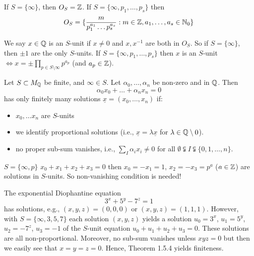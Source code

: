 \documentclass[NumTh.tex]{subfiles}
\begin{document}
\begin{ex}
  If $S = \{\infty\}$, then $O_S = \mathbb{Z}$.
  If $S = \{\infty,p_1,\dots,p_s \}$ then
  \[ O_S = \{ \frac{m}{p_1^{a_1} \dots p_s^{a_s}} : m \in \mathbb{Z}, a_1,\dots,a_s \in \mathbb{N}_0 \} \]
\end{ex}

We say $x \in \mathbb{Q}$ is an $S$-unit if $x \neq 0$ and $x, x^{-1}$ are both in $O_S$.
So if $S = \{ \infty \}$, then $\pm 1$ are the only $S$-units. If $S = \{ \infty,p_1,\dots,p_s \}$ then $x$ is an $S$-unit $\iff x = \pm \prod_{p \in S \setminus \infty} p^{a_p}$ (and $a_p \in \mathbb{Z}$).

\begin{theorem}
  Let $S \subset M_{\mathbb{Q}}$ be finite, and $\infty \in S$. Let $\alpha_0,\dots,\alpha_n$ be non-zero and in $\mathbb{Q}$.
  Then 
  \[ \alpha_0 x_0 + \dots + \alpha_n x_n = 0 \]
  has only finitely many solutions $\underline{x} = (x_0,\dots,x_n)$ if:
  \begin{itemize}
    \item $x_0,\dots x_n$ are $S$-units
    \item we identify proportional solutions (i.e., $\underline{x} = \lambda \underline{x}$ for $ \lambda \in \mathbb{Q} \setminus 0$).
    \item no proper sub-sum vanishes, i.e., $\sum_{I} \alpha_i x_i \neq 0$ for all $\emptyset \subsetneqq I \subsetneqq \{0,1,\dots,n\}$.
  \end{itemize}
\end{theorem}

\begin{rem}
  $S = \{\infty, p \}$ $x_0+x_1+x_2+x_3 = 0$ then $x_0 = - x_1 =  1$, $x_2 = - x_3 = p^a$ ($a \in \mathbb{Z}$)
  are solutions in $S$-units. So non-vanishing condition is needed!
\end{rem}

\begin{ex}
  The exponential Diophantine equation 
  \[ 3^x + 5^y - 7^z = 1 \]
  has solutions, e.g., $(x,y,z) = (0,0,0)$ or $(x,y,z) = (1,1,1)$.
  However, with $S = \{ \infty,3,5,7 \}$ each solution $(x,y,z)$ yields a solution $u_0 = 3^x$, $u_1 = 5^y$, $u_2 = - 7^z$, $u_3 = - 1$ of the $S$-unit equation $u_0 + u_1 + u_2 + u_3 = 0$.
  These solutions are all non-proportional.
  Moreover, no sub-sum vanishes unless $x y z = 0$ but then we easily see that $x=y=z=0$.
  Hence, Theorem 1.5.4 yields finiteness.
\end{ex}
\end{document}
